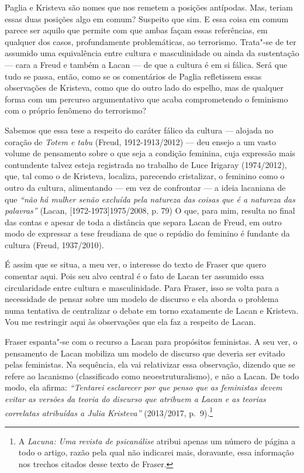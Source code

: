 Paglia e Kristeva são nomes que nos remetem a posições antípodas. Mas,
teriam essas duas posições algo em comum? Suspeito que sim. E essa coisa
em comum parece ser aquilo que permite com que ambas façam essas
referências, em qualquer dos casos, profundamente problemáticas, ao
terrorismo. Trata"-se de ter assumido uma equivalência entre cultura e
masculinidade ou ainda da sustentação --- cara a Freud e também a Lacan
--- de que a cultura é em si fálica. Será que tudo se passa, então, como
se os comentários de Paglia refletissem essas observações de Kristeva,
como que do outro lado do espelho, mas de qualquer forma com um percurso
argumentativo que acaba comprometendo o feminismo com o próprio fenômeno
do terrorismo?

Sabemos que essa tese a respeito do caráter fálico da cultura --- alojada
no coração de \emph{Totem e tabu} (Freud, 1912-1913/2012) --- deu ensejo
a um vasto volume de pensamento sobre o que seja a condição feminina,
cuja expressão mais contundente talvez esteja registrada no trabalho de
Luce Irigaray (1974/2012), que, tal como o de Kristeva, localiza,
parecendo cristalizar, o feminino como o outro da cultura, alimentando
--- em vez de confrontar --- a ideia lacaniana de que \emph{``não há
mulher senão excluída pela natureza das coisas que é a natureza das
palavras''} (Lacan, {[}1972-1973{]}1975/2008, p. 79) O que, para mim,
resulta no final das contas e apesar de toda a distância que separa
Lacan de Freud, em outro modo de expressar a tese freudiana de que o
repúdio do feminino é fundante da cultura (Freud, 1937/2010).

É assim que se situa, a meu ver, o interesse do texto de Fraser que
quero comentar aqui. Pois seu alvo central é o fato de Lacan ter
assumido essa circularidade entre cultura e masculinidade. Para Fraser,
isso se volta para a necessidade de pensar sobre um modelo de discurso e
ela aborda o problema numa tentativa de centralizar o debate em torno
exatamente de Lacan e Kristeva. Vou me restringir aqui às observações
que ela faz a respeito de Lacan.

Fraser espanta"-se com o recurso a Lacan para propósitos feministas. A
seu ver, o pensamento de Lacan mobiliza um modelo de discurso que
deveria ser evitado pelas feministas. Na sequência, ela vai relativizar
essa observação, dizendo que se refere ao lacanismo (classificado como
neoestruturalismo), e não a Lacan. De todo modo, ela afirma:
\emph{``Tentarei esclarecer por que penso que as feministas devem evitar
as versões da teoria do discurso que atribuem a Lacan e as teorias
correlatas atribuídas a Julia Kristeva''} (2013/2017, p.~9).\footnote{A
  \emph{Lacuna: Uma revista de psicanálise} atribui apenas um número de
  página a todo o artigo, razão pela qual não indicarei mais, doravante,
  essa informação nos trechos citados desse texto de Fraser.}

